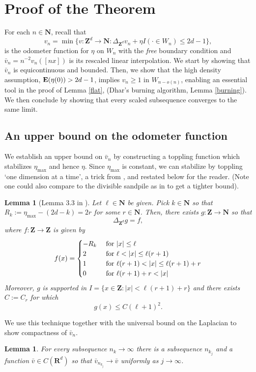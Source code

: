 \documentclass[12pt]{amsart}
\newcommand{\R}{\mathbf{R}}
\newcommand{\Z}{\mathbf{Z}}
\newcommand{\N}{\mathbf{N}}
\newcommand{\E}{\mathop{\bf E{}}}
\newtheorem{lemma}[theorem]{Lemma}
\begin{document}
\section{Proof of the Theorem}\label{sec:proof_of_theorem}
For each $n \in \N$, recall that
\[
v_n = \min \{ v : \Z^d \to \N: \Delta_{\Z^d} v_n + \eta I(\cdot \in W_n) \leq 2 d-1 \}, 
\]
is the odometer function for $\eta$ on $W_n$ with the {\it free} boundary condition and $\bar{v}_n = n^{-2} v_n([n x])$ is its rescaled linear interpolation.  
We start by showing that $\bar{v}_n$ is equicontinuous and bounded. Then, we show that the high density assumption, $\E(\eta(0))  > 2 d -1$, 
implies $v_n \geq 1$ in $W_{n - o(n)}$, enabling an essential tool in the proof of Lemma \ref{flat}, (Dhar's burning algorithm, Lemma \ref{burning}). 
We then conclude by showing that every scaled subsequence converges to the same limit. 

\subsection{An upper bound on the odometer function} \label{subsec:compactness}
We establish an upper bound on $\bar{v}_n$ by constructing a toppling function 
which stabilizes $\eta_{\max}$ and hence $\eta$. Since $\eta_{\max}$ is constant, we can stabilize by toppling 
\lq one dimension at a time\rq, a trick from \cite{ fey2010growth}, and restated 
below for the reader. (Note one could also compare to the divisible sandpile as in \cite{levine2009strong} to get a tighter bound).
\begin{lemma}[Lemma 3.3 in \cite{ fey2010growth}] \label{lemma:one_dim}
	Let $\ell \in \N$ be given. Pick $k \in \N$ so that $R_k := \eta_{\max} - (2d-k) = 2 r $ for some $r \in \N$. Then, 
	there exists $g: \Z \to \N$ so that 
	\[
	\Delta_{\Z^d} g = f, 
	\]
	where  $f: \Z \to \Z$ is given by 
	\[
	f(x) = 
	\begin{cases} 
	-R_k &\mbox{ for $|x| \leq \ell$ }  \\
	2 &\mbox{ for $\ell < |x| \leq \ell(r + 1) $} \\
	1 &\mbox{ for $\ell(r+1)  <  |x| \leq \ell(r+1) + r$} \\
	0 &\mbox{ for $ \ell(r+1) + r< |x|$}
	\end{cases}
	\]
	Moreover, $g$ is supported in $I = \{ x \in \Z: |x| < \ell(r+1) + r\}$ and there exists $C:= C_{r}$ for which 
	\begin{equation} \label{quadratic bound}
	g(x) \leq C (\ell+1)^2. %
	\end{equation}
\end{lemma}
We use this technique together with the universal bound on the Laplacian to show compactness of $\bar{v}_n$. 
\begin{lemma}\label{compactness}
For every subsequence $n_k \to \infty$ there is a subsequence $n_{k_j}$
and a function $\bar{v} \in C(\R^d)$ so that $\bar{v}_{n_{k_j}} \to \bar{v}$
uniformly as $j \to \infty$. 
\end{lemma}
\end{document}
